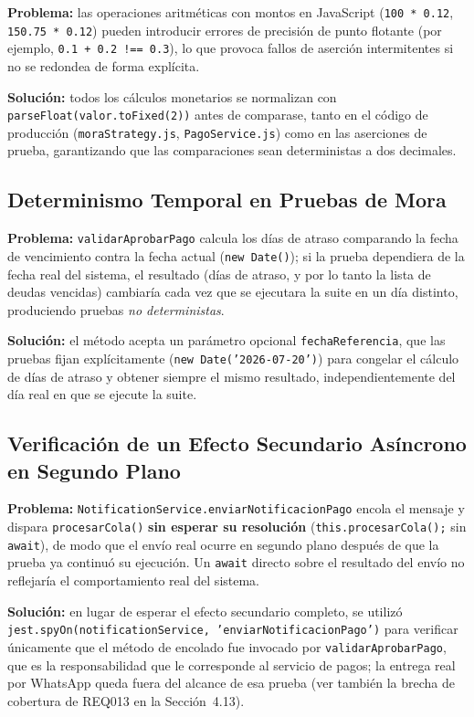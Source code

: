 \documentclass[12pt,a4paper]{article}
\begin{document}
\textbf{Problema:} las operaciones aritméticas con montos en JavaScript (\texttt{100 *
0.12}, \texttt{150.75 * 0.12}) pueden introducir errores de precisión de punto flotante
(por ejemplo, \texttt{0.1 + 0.2 !== 0.3}), lo que provoca fallos de aserción
intermitentes si no se redondea de forma explícita.

\textbf{Solución:} todos los cálculos monetarios se normalizan con
\texttt{parseFloat(valor.toFixed(2))} antes de comparase, tanto en el código de
producción (\texttt{moraStrategy.js}, \texttt{PagoService.js}) como en las aserciones de
prueba, garantizando que las comparaciones sean deterministas a dos decimales.

\subsection{Determinismo Temporal en Pruebas de Mora}

\textbf{Problema:} \texttt{validarAprobarPago} calcula los días de atraso comparando la
fecha de vencimiento contra la fecha actual (\texttt{new Date()}); si la prueba dependiera
de la fecha real del sistema, el resultado (días de atraso, y por lo tanto la lista de
deudas vencidas) cambiaría cada vez que se ejecutara la suite en un día distinto,
produciendo pruebas \emph{no deterministas}.

\textbf{Solución:} el método acepta un parámetro opcional \texttt{fechaReferencia}, que
las pruebas fijan explícitamente (\texttt{new Date('2026-07-20')}) para congelar el
cálculo de días de atraso y obtener siempre el mismo resultado, independientemente del
día real en que se ejecute la suite.

\subsection{Verificación de un Efecto Secundario Asíncrono en Segundo Plano}

\textbf{Problema:} \texttt{NotificationService.enviarNotificacionPago} encola el mensaje y
dispara \texttt{procesarCola()} \textbf{sin esperar su resolución}
(\texttt{this.procesarCola();} sin \texttt{await}), de modo que el envío real ocurre en
segundo plano después de que la prueba ya continuó su ejecución. Un \texttt{await}
directo sobre el resultado del envío no reflejaría el comportamiento real del sistema.

\textbf{Solución:} en lugar de esperar el efecto secundario completo, se utilizó
\texttt{jest.spyOn(notificationService, 'enviarNotificacionPago')} para verificar
\'unicamente que el método de encolado fue invocado por \texttt{validarAprobarPago}, que es
la responsabilidad que le corresponde al servicio de pagos; la entrega real por WhatsApp
queda fuera del alcance de esa prueba (ver también la brecha de cobertura de REQ013 en
la Sección~4.13).
\end{document}
